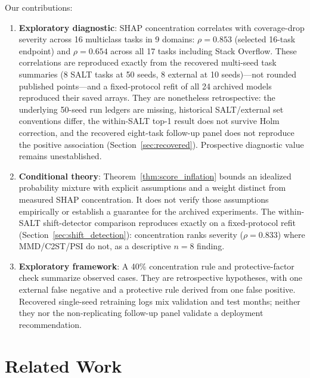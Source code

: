\documentclass[accepted]{uai2026} %
\begin{document}
Our contributions:

\begin{enumerate}
    \item \textbf{Exploratory diagnostic}: SHAP concentration correlates with coverage-drop severity across 16 multiclass tasks in 9 domains: $\rho=0.853$ (selected 16-task endpoint) and $\rho=0.654$ across all 17 tasks including Stack Overflow. These correlations are reproduced exactly from the recovered multi-seed task summaries (8 SALT tasks at 50 seeds, 8 external at 10 seeds)---not rounded published points---and a fixed-protocol refit of all 24 archived models reproduced their saved arrays. They are nonetheless retrospective: the underlying 50-seed run ledgers are missing, historical SALT/external set conventions differ, the within-SALT top-1 result does not survive Holm correction, and the recovered eight-task follow-up panel does not reproduce the positive association (Section~\ref{sec:recovered}). Prospective diagnostic value remains unestablished.

    \item \textbf{Conditional theory}: Theorem~\ref{thm:score_inflation} bounds an idealized probability mixture with explicit assumptions and a weight distinct from measured SHAP concentration. It does not verify those assumptions empirically or establish a guarantee for the archived experiments. The within-SALT shift-detector comparison reproduces exactly on a fixed-protocol refit (Section~\ref{sec:shift_detection}): concentration ranks severity ($\rho=0.833$) where MMD/C2ST/PSI do not, as a descriptive $n=8$ finding.

    \item \textbf{Exploratory framework}: A 40\% concentration rule and protective-factor check summarize observed cases. They are retrospective hypotheses, with one external false negative and a protective rule derived from one false positive. Recovered single-seed retraining logs mix validation and test months; neither they nor the non-replicating follow-up panel validate a deployment recommendation.
\end{enumerate}

\section{Related Work}\label{sec:related}
\end{document}
